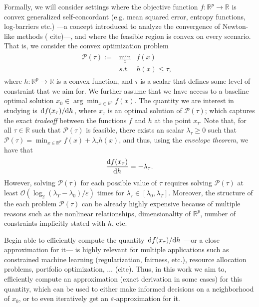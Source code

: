 \documentclass[11pt]{article}
\theoremstyle{definition}
\theoremstyle{remark}
\theoremstyle{plain}
\theoremstyle{definition}
\newcommand{\R}{\mathbb{R}}
\newcommand{\1}{\mathbf{1}}
\newcommand{\X}{\mathcal{X}}
\renewcommand{\P}{\mathcal{P}}
\newcommand{\citeReq}{{\color{red} (cite)}}
\renewcommand{\R}{\mathbb{R}}
\begin{document}
Formally, we will consider settings where the objective function $f:\R^p \rightarrow \R$ is convex generalized self-concordant (e.g. mean squared error, entropy functions, log-barriers etc.) ---a concept introduced to analyze the convergence of Newton-like methods ({\color{red} cite})---, and where the feasible region is convex on every scenario. That is, we consider the convex optimization problem \begin{align}
    \begin{array}{crlc}
    \label{opt:P_tau}
      \P(\tau):=& \min_{x}  & f(x) \\
       & s.t. & h(x) \leq \tau, &
    \end{array}
\end{align}
where $h:\R^p \rightarrow \R$ is a convex function, and $\tau$ is a scalar that defines some level of constraint that we aim for. We further assume that we have access to a baseline optimal solution $x_0 \in \arg\min_{x\in \R^p} f(x)$. The quantity we are interest in studying is $\odv{f(x_\tau)}/{h}$, where $x_\tau$ is an optimal solution of $\P(\tau)$; which captures the exact \textit{tradeoff} between the functions $f$ and $h$ at the point $x_\tau$. Note that, for all $\tau \in \R$ such that $\P(\tau)$ is feasible, there exists an scalar $\lambda_\tau \geq 0$ such that $\P(\tau) = \min_{x\in \R^p} f(x) + \lambda_{\tau} h(x)$, and thus, using the \textit{envelope theorem}, we have that  
\begin{align*}
    \odv{f(x_\tau)}{h}=-\lambda_\tau.
\end{align*}
However, solving $\P(\tau)$ for each possible value of $\tau$ requires solving $\P(\tau)$ at least $\mathcal{O}\left({\log_2(\lambda_{{T}}-\lambda_{{0}})}/{\varepsilon}\right)$ times for $\lambda_\tau \in [\lambda_0, \lambda_T]$. Moreover, the structure of the each problem $\P(\tau)$ can be already highly expensive because of multiple reasons such as the nonlinear relationships, dimensionality of $\R^p$, number of constraints implicitly stated with $h$, etc. 

Begin able to efficiently compute the quantity $\odv{f(x_\tau)}/{h}$ ---or a close approximation for it--- is highly relevant for multiple applications such as constrained machine learning (regularization, fairness, etc.), resource allocation problems, portfolio optimization, $\ldots$ \citeReq. Thus, in this work we aim to, efficiently compute an approximation (exact derivation in some cases) for this quantity, which can be used to either make informed decisions on a neighborhood of $x_0$, or to even iteratively get an $\varepsilon$-approximation for it.
\end{document}
